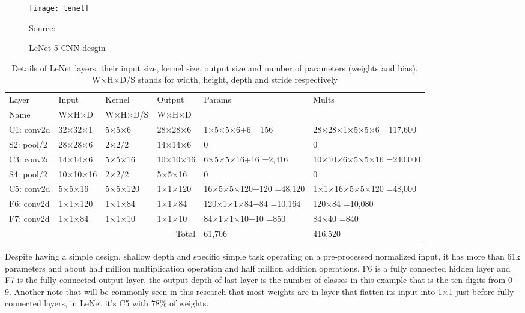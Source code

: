 \begin{figure}[!h]
\centering
\texttt{[image: lenet]}
\caption{LeNet-5 CNN desgin}\label{fig:lenet}
{Source: \autocite{lecun1998gradient}\hfill}
\end{figure}


\begin{table*}\caption{Details of LeNet layers, their input size, kernel size, output size and number of parameters (weights and bias).  W×H×D/S stands for width, height, depth and stride respectively}\label{table:lenet-cnn}
\centering
\begin{small}
\begin{tabularx}{\textwidth}{llllXX}
\toprule
Layer & Input & Kernel & Output & Params & Mults \\
Name & W×H×D & W×H×D/S & W×H×D & &  \\
\midrule
C1: conv2d & 32×32×1 & 5×5×6 &  28×28×6 & 1×5×5×6+6 =156 & 28×28×1×5×5×6 =117,600 \\
S2: pool/2 & 28×28×6 & 2×2/2 &  14×14×6 & 0 & 0 \\
C3: conv2d & 14×14×6 & 5×5×16 & 10×10×16 & 6×5×5×16+16 =2,416 & 10×10×6×5×5×16 =240,000 \\
S4: pool/2 & 10×10×16 & 2×2/2 &  5×5×16 & 0 & 0 \\
C5: conv2d & 5×5×16 & 5×5×120 &  1×1×120 & 16×5×5×120+120 =48,120 & 1×1×16×5×5×120 =48,000 \\
F6: conv2d & 1×1×120 & 1×1×84 &  1×1×84 & 120×1×1×84+84 =10,164 & 120×84 =10,080 \\
F7: conv2d & 1×1×84 & 1×1×10 &   1×1×10 & 84×1×1×10+10 =850 & 84×40 =840 \\
\cmidrule{4-6}
\multicolumn{4}{r}{Total} & 61,706 & 416,520 \\
\bottomrule
\end{tabularx}
\end{small}
\end{table*}

Despite having a simple design, shallow depth and specific simple task operating on a pre-processed normalized input,
it has more than 61k parameters and about half million multiplication operation and half million addition operations.
F6 is a fully connected hidden layer and F7 is the fully connected output layer,
the output depth of last layer is the number of classes in this example that is the ten digits from 0-9.
Another note that will be commonly seen in this research that most weights are in layer that flatten its input into 1×1 just before fully connected layers,
in LeNet it's C5 with 78\% of weights.


